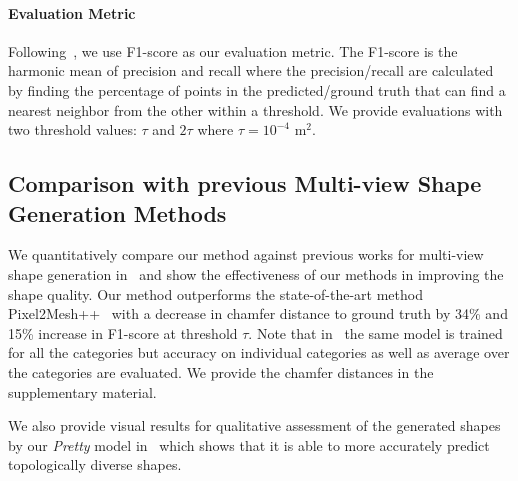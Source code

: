 
\paragraph{Evaluation Metric}\vspace{-4mm}
Following~\cite{wang2018pixel2mesh, wen2019pixel2mesh++}, we use F1-score as our evaluation metric.
The F1-score is the harmonic mean of precision and recall where the precision/recall are calculated by finding the percentage of points in the predicted/ground truth that can find a nearest neighbor from the other within a threshold.
We provide evaluations with two threshold values: $\tau$ and $2\tau$ where $\tau=10^{-4}$  m$^2$.

\subsection{Comparison with previous Multi-view Shape Generation Methods}
We quantitatively compare our method against previous works for multi-view shape generation in~ and show the effectiveness of our methods in improving the shape quality. Our method outperforms the state-of-the-art method  Pixel2Mesh++~\cite{wen2019pixel2mesh++} with
a decrease in chamfer distance to ground truth by 34\% and 15\% increase in F1-score at threshold $\tau$.
Note that in~ the same model is trained for all the categories but accuracy on individual categories as well as average over the categories are evaluated.
We provide the chamfer distances in the supplementary material.


We also provide visual results for qualitative assessment of the generated shapes by our \emph{Pretty} model in~ which shows that it is able to more accurately predict topologically diverse shapes.


